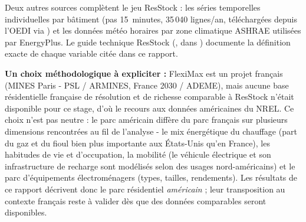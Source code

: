 Deux autres sources complètent le jeu ResStock : les séries temporelles individuelles par
bâtiment (pas 15~minutes, 35\,040 lignes/an, téléchargées depuis l'OEDI via
) et les données météo horaires par zone climatique
ASHRAE utilisées par EnergyPlus. Le guide technique ResStock
(, dans ) documente la
définition exacte de chaque variable citée dans ce rapport.

\textbf{Un choix méthodologique à expliciter :} FlexiMax est un projet français (MINES Paris -
PSL / ARMINES, France 2030 / ADEME), mais aucune base résidentielle française de résolution
et de richesse comparable à ResStock n'était disponible pour ce stage, d'où le recours aux
données américaines du NREL. Ce choix n'est pas neutre : le parc américain diffère du parc
français sur plusieurs dimensions rencontrées au fil de l'analyse - le mix énergétique du
chauffage (part du gaz et du fioul bien plus importante aux États-Unis qu'en France), les
habitudes de vie et d'occupation, la mobilité (le
véhicule électrique et son infrastructure de recharge sont modélisés selon des usages
nord-américains) et le parc d'équipements électroménagers (types, tailles, rendements). Les
résultats de ce rapport décrivent donc le parc résidentiel \emph{américain} ; leur transposition
au contexte français reste à valider dès que des données comparables seront disponibles.

